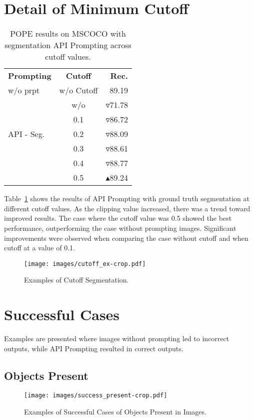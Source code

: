 \onecolumn
\section{Detail of Minimum Cutoff}

\begin{table}[h!]
\centering
\begin{tabular}{lcr}
\toprule
\textbf{Prompting} & \textbf{Cutoff} &  \textbf{Rec.}  \\ \cmidrule(lr){1-3}
 w/o prpt & w/o Cutoff & 89.19 \\
\multirow{5}{*}{API - Seg.} & w/o & \ensuremath{\triangledown}71.78 \\
& 0.1 & \ensuremath{\triangledown}86.72 \\
& 0.2 & \ensuremath{\triangledown}88.09 \\
& 0.3 & \ensuremath{\triangledown}88.61 \\
& 0.4 & \ensuremath{\triangledown}88.77 \\
& 0.5 & \ensuremath{\blacktriangle}89.24 \\
 \bottomrule
\end{tabular}
\caption{POPE results on MSCOCO with segmentation API Prompting across cutoff values.}
\label{table2}
\end{table}

Table~\ref{table2} shows the results of API Prompting with ground truth segmentation at different cutoff values. As the clipping value increased, there was a trend toward improved results. The case where the cutoff value was 0.5 showed the best performance, outperforming the case without prompting images. Significant improvements were observed when comparing the case without cutoff and when cutoff at a value of 0.1.

\begin{figure}[h!]
    \centering
    \texttt{[image: images/cutoff\_ex-crop.pdf]}
    \caption{Examples of Cutoff Segmentation.}
\end{figure}

\newpage

\section{Successful Cases}
Examples are presented where images without prompting led to incorrect outputs, while API Prompting resulted in correct outputs.

\subsection{Objects Present}
\begin{figure}[h!]
    \centering
    \texttt{[image: images/success\_present-crop.pdf]}
    \caption{Examples of Successful Cases of Objects Present in Images.}
\end{figure}

